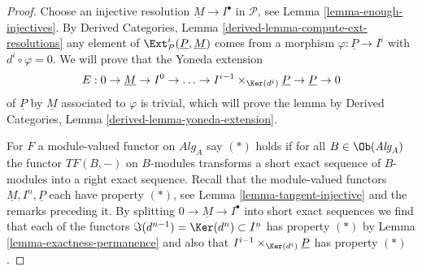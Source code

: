 \begin{proof}
Choose an injective resolution $\underline{M} \to I^\bullet$ in
$\mathcal{P}$, see
Lemma \ref{lemma-enough-injectives}.
By
Derived Categories, Lemma \ref{derived-lemma-compute-ext-resolutions}
any element of $\Ext^i_\mathcal{P}(\underline{P}, \underline{M})$
comes from a morphism $\varphi : \underline{P} \to I^i$ with
$d^i \circ \varphi = 0$. We will prove that the
Yoneda extension
$$
E : 0 \to \underline{M} \to I^0 \to \ldots \to
I^{i - 1} \times_{\Ker(d^i)} \underline{P} \to \underline{P} \to 0
$$
of $\underline{P}$ by $\underline{M}$
associated to $\varphi$ is trivial, which will prove the lemma by
Derived Categories, Lemma \ref{derived-lemma-yoneda-extension}.

\medskip\noindent
For $F$ a module-valued functor on $\textit{Alg}_A$
say $(*)$ holds if for all $B \in \Ob(\textit{Alg}_A)$ the
functor $TF(B, -)$ on $B$-modules transforms a short exact sequence
of $B$-modules into a right exact sequence.
Recall that the module-valued functors $\underline{M}, I^n, \underline{P}$
each have property $(*)$, see
Lemma \ref{lemma-tangent-injective}
and the remarks preceding it.
By splitting $0 \to \underline{M} \to I^\bullet$ into short
exact sequences we find that each of the functors
$\Im(d^{n - 1}) = \Ker(d^n) \subset I^n$ has property $(*)$ by
Lemma \ref{lemma-exactness-permanence}
and also that $I^{i - 1} \times_{\Ker(d^i)} \underline{P}$ has property
$(*)$.


\end{proof}
